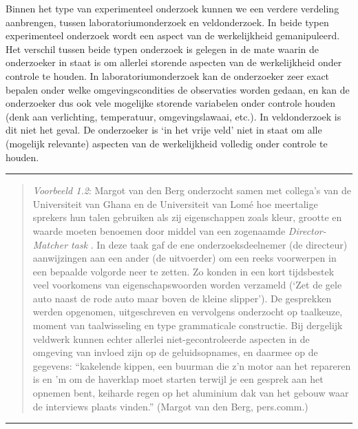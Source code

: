 \documentclass[
]{book}
\begin{document}
Binnen het type van experimenteel onderzoek kunnen we een verdere
verdeling aanbrengen, tussen laboratoriumonderzoek en veldonderzoek. In
beide typen experimenteel onderzoek wordt een aspect van de
werkelijkheid gemanipuleerd. Het verschil tussen beide typen onderzoek
is gelegen in de mate waarin de onderzoeker in staat is om allerlei
storende aspecten van de werkelijkheid onder controle te houden. In
laboratoriumonderzoek kan de onderzoeker zeer exact bepalen onder welke
omgevingscondities de observaties worden gedaan, en kan de onderzoeker
dus ook vele mogelijke storende variabelen onder controle houden (denk
aan verlichting, temperatuur, omgevingslawaai, etc.). In veldonderzoek
is dit niet het geval. De onderzoeker is `in het vrije veld' niet in
staat om alle (mogelijk relevante) aspecten van de werkelijkheid
volledig onder controle te houden.

\begin{center}\rule{0.5\linewidth}{0.5pt}\end{center}

\begin{quote}
\emph{Voorbeeld 1.2}: Margot van den Berg
onderzocht samen met collega's van de Universiteit van Ghana en de
Universiteit van Lomé hoe meertalige sprekers hun talen gebruiken als
zij eigenschappen zoals kleur, grootte en waarde moeten benoemen door
middel van een zogenaamde \emph{Director-Matcher task} \citep{BAEYT2017}. In deze
taak gaf de ene onderzoeksdeelnemer (de directeur) aanwijzingen aan een
ander (de uitvoerder) om een reeks voorwerpen in een bepaalde volgorde
neer te zetten. Zo konden in een kort tijdsbestek veel voorkomens van
eigenschapswoorden worden verzameld (`Zet de gele auto naast de rode
auto maar boven de kleine slipper'). De gesprekken werden opgenomen,
uitgeschreven en vervolgens onderzocht op taalkeuze, moment van
taalwisseling en type grammaticale constructie. Bij dergelijk veldwerk
kunnen echter allerlei niet-gecontroleerde aspecten in de omgeving van
invloed zijn op de geluidsopnames, en daarmee op de gegevens: ``kakelende kippen, een buurman die z'n motor aan het repareren is en 'm om de haverklap moet starten terwijl je een gesprek aan het opnemen bent,
keiharde regen op het aluminium dak van het gebouw waar de interviews
plaats vinden.'' (Margot van den Berg, pers.comm.)
\end{quote}

\begin{center}\rule{0.5\linewidth}{0.5pt}\end{center}
\end{document}
